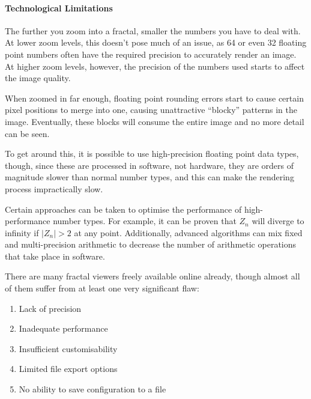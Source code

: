 \begin{multicols}{2}
	\paragraph{Technological Limitations} The further you zoom into a fractal, smaller the numbers you have to deal with. At lower zoom levels, this doesn't pose much of an issue, as \SI{64}{\bit} or even \SI{32}{\bit} floating point numbers often have the required precision to accurately render an image. At higher zoom levels, however, the precision of the numbers used starts to affect the image quality.
	
	When zoomed in far enough, floating point rounding errors start to cause certain pixel positions to merge into one, causing unattractive ``blocky'' patterns in the image. Eventually, these blocks will consume the entire image and no more detail can be seen.
	
	To get around this, it is possible to use high-precision floating point data types, though, since these are processed in software, not hardware, they are orders of magnitude slower than normal number types, and this can make the rendering process impractically slow.
	
	Certain approaches can be taken to optimise the performance of high-performance number types. For example, it can be proven that \(Z_n\) will diverge to infinity if \(|Z_n|>2\) at any point. Additionally, advanced algorithms can mix fixed and multi-precision arithmetic to decrease the number of arithmetic operations that take place in software.
\end{multicols}

There are many fractal viewers freely available online already, though almost all of them suffer from at least one very significant flaw:

\begin{enumerate}
	\item{Lack of precision}
	\item{Inadequate performance}
	\item{Insufficient customisability}
	\item{Limited file export options}
	\item{No ability to save configuration to a file}
\end{enumerate}

\vspace{0.5cm}

